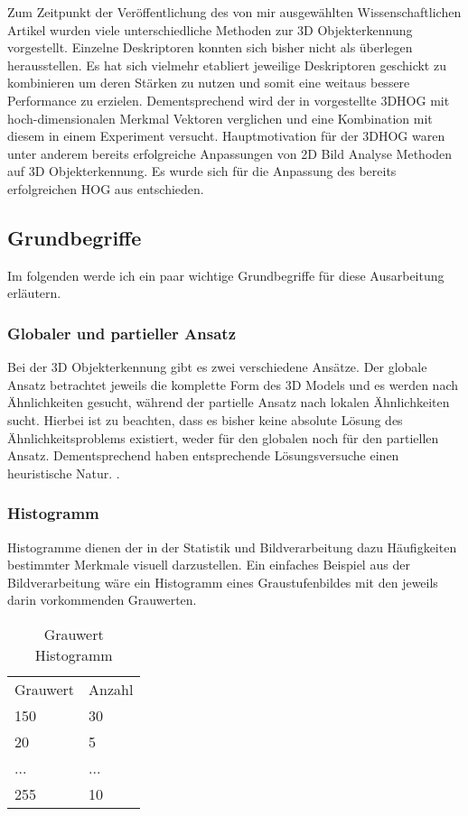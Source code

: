 Zum Zeitpunkt der Veröffentlichung des von mir ausgewählten Wissenschaftlichen Artikel wurden viele
unterschiedliche Methoden zur 3D Objekterkennung vorgestellt. Einzelne Deskriptoren konnten sich 
bisher nicht als überlegen herausstellen. Es hat sich vielmehr etabliert jeweilige Deskriptoren
geschickt zu kombinieren um deren Stärken zu nutzen und somit eine weitaus bessere Performance zu erzielen.
Dementsprechend wird der in \cite{scherer2010histograms} vorgestellte 3DHOG mit hoch-dimensionalen Merkmal Vektoren
verglichen und eine Kombination mit diesem in einem Experiment versucht.
\newline
Hauptmotivation für der 3DHOG waren unter anderem bereits erfolgreiche Anpassungen von 2D Bild Analyse Methoden auf 3D Objekterkennung. Es wurde sich für die Anpassung des bereits erfolgreichen HOG aus \cite{dalal2005histograms} entschieden.


\subsection{Grundbegriffe}
Im folgenden werde ich ein paar wichtige Grundbegriffe für diese Ausarbeitung erläutern. 

\subsubsection{Globaler und partieller Ansatz}
Bei der 3D Objekterkennung gibt es zwei verschiedene Ansätze. Der globale Ansatz betrachtet jeweils die komplette Form des
3D Models und es werden nach Ähnlichkeiten gesucht, während der partielle Ansatz nach lokalen Ähnlichkeiten sucht. Hierbei ist zu beachten, dass es bisher keine absolute Lösung des Ähnlichkeitsproblems existiert, weder für den globalen noch für den partiellen Ansatz. Dementsprechend haben entsprechende Lösungsversuche einen heuristische Natur. \cite{scherer2010histograms}.

\subsubsection{Histogramm}
Histogramme dienen der in der Statistik und Bildverarbeitung dazu Häufigkeiten bestimmter Merkmale
visuell darzustellen. Ein einfaches Beispiel aus der Bildverarbeitung wäre ein Histogramm eines
Graustufenbildes mit den jeweils darin vorkommenden Grauwerten. 

\begin{table}[H]
	\centering
	\caption{Grauwert Histogramm}
	\label{bsp Histogramm}
	\begin{tabular}{ll}
		Grauwert & Anzahl \\
		150      & 30     \\
		20       & 5      \\
		...      & ...    \\
		255      & 10    
	\end{tabular}
\end{table}

